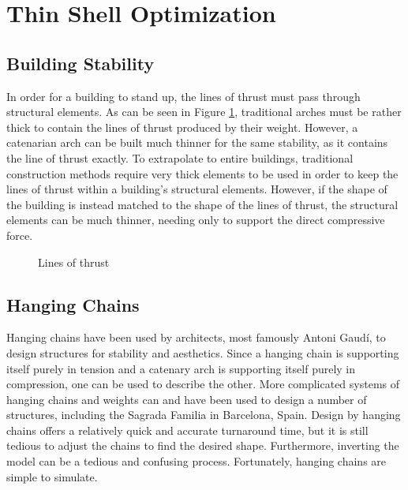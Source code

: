 \documentclass{thesis}
\begin{document}
\section{Thin Shell Optimization}

\subsection{Building Stability} \label{stability}
In order for a building to stand up, the lines of thrust must pass through structural elements.  As can be seen in Figure \ref{FIGURE_arch_lines},
traditional arches must be rather thick to contain the lines of thrust produced by their weight.  However, a catenarian arch can be built
much thinner for the same stability, as it contains the line of thrust exactly.
To extrapolate to entire buildings, traditional construction methods require very thick elements to be used in order to keep the lines of thrust
within a building's structural elements.  However, if the shape of the building is instead matched to the shape of the lines of thrust, the
structural elements can be much thinner, needing only to support the direct compressive force.
\begin{figure}
\caption{Lines of thrust}
\label{FIGURE_arch_lines}
\end{figure}

\subsection{Hanging Chains}
Hanging chains have been used by architects, most famously Antoni Gaud\'{i}, to design structures for stability and aesthetics.  Since a hanging
chain is supporting itself purely in tension and a catenary arch is supporting itself purely in compression, one can be used to describe the other.
More complicated systems of hanging chains and weights can and have been used to design a number of structures, including the Sagrada Familia in
Barcelona, Spain.  Design by hanging chains offers a relatively quick and accurate turnaround time, but it is still tedious to adjust the chains
to find the desired shape.  Furthermore, inverting the model can be a tedious and confusing process.  Fortunately, hanging chains are simple to simulate.
\end{document}
